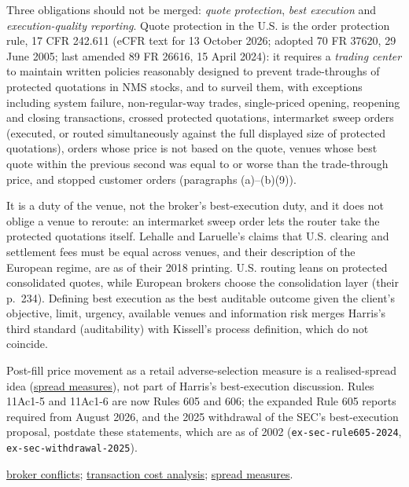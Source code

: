 \begin{qfdefinition}
 Three obligations should not be merged: \emph{quote protection}, \emph{best execution} and \emph{execution-quality reporting}. Quote protection in the U.S. is the order protection rule, 17 CFR 242.611 (eCFR text for 13 October 2026; adopted 70 FR 37620, 29 June 2005; last amended 89 FR 26616, 15 April 2024): it requires a \emph{trading center} to maintain written policies reasonably designed to prevent trade-throughs of protected quotations in NMS stocks, and to surveil them, with exceptions including system failure, non-regular-way trades, single-priced opening, reopening and closing transactions, crossed protected quotations, intermarket sweep orders (executed, or routed simultaneously against the full displayed size of protected quotations), orders whose price is not based on the quote, venues whose best quote within the previous second was equal to or worse than the trade-through price, and stopped customer orders (paragraphs (a)--(b)(9)).

It is a duty of the venue, not the broker's best-execution duty, and it does not oblige a venue to reroute: an intermarket sweep order lets the router take the protected quotations itself. Lehalle and Laruelle's claims that U.S. clearing and settlement fees must be equal across venues, and their description of the European regime, are as of their 2018 printing. U.S. routing leans on protected consolidated quotes, while European brokers choose the consolidation layer (their p.~234). Defining best execution as the best auditable outcome given the client's objective, limit, urgency, available venues and information risk merges Harris's third standard (auditability) with Kissell's process definition, which do not coincide.

Post-fill price movement as a retail adverse-selection measure is a realised-spread idea (\hyperref[def:spread-measures]{spread measures}), not part of Harris's best-execution discussion. Rules 11Ac1-5 and 11Ac1-6 are now Rules 605 and 606; the expanded Rule 605 reports required from August 2026, and the 2025 withdrawal of the SEC's best-execution proposal, postdate these statements, which are as of 2002 (\nolinkurl{ex-sec-rule605-2024}, \nolinkurl{ex-sec-withdrawal-2025}).

 \hyperref[def:broker-agency-conflicts]{broker conflicts}; \hyperref[meth:transaction-cost-analysis]{transaction cost analysis}; \hyperref[def:spread-measures]{spread measures}.

\end{qfdefinition}

